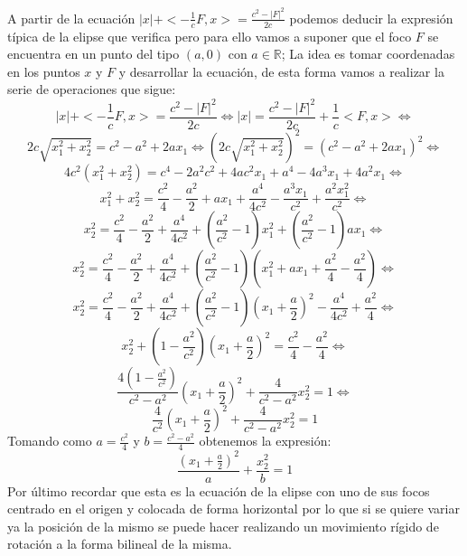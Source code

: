 \documentclass[a4paper, 11pt]{article} %
\begin{document}
	A partir de la ecuación $|x|+<-\frac{1}{c}F,x> = \frac{c^2-|F|^2}{2c}$ podemos deducir la expresión típica de la elipse que verifica pero para ello vamos a suponer que el foco $F$ se encuentra en un punto del tipo $(a, 0)$ con $a\in \mathbb{R}$; La idea es tomar coordenadas en los puntos $x$ y $F$ y desarrollar la ecuación, de esta forma vamos a realizar la serie de operaciones que sigue:
	$$|x|+<-\frac{1}{c}F,x> = \frac{c^2-|F|^2}{2c} \Leftrightarrow |x| = \frac{c^2-|F|^2}{2c}+\frac{1}{c}<F,x> \Leftrightarrow$$
	$$2c\sqrt{x_1^2+x_2^2} = c^2-a^2+2ax_1 \Leftrightarrow (2c\sqrt{x_1^2+x_2^2})^2 = (c^2-a^2+2ax_1)^2 \Leftrightarrow$$
	$$4c^2(x_1^2+x_2^2)=c^4-2a^2c^2+4ac^2x_1+a^4-4a^3x_1+4a^2x_1 \Leftrightarrow$$
	$$x_1^2+x_2^2=\frac{c^2}{4}-\frac{a^2}{2}+ax_1+\frac{a^4}{4c^2}-\frac{a^3x_1}{c^2}+\frac{a^2x_1^2}{c^2} \Leftrightarrow$$
	$$x_2^2 = \frac{c^2}{4}-\frac{a^2}{2}+\frac{a^4}{4c^2}+(\frac{a^2}{c^2}-1)x_1^2 +(\frac{a^2}{c^2}-1)ax_1 \Leftrightarrow$$
	$$x_2^2 = \frac{c^2}{4}-\frac{a^2}{2}+\frac{a^4}{4c^2}+(\frac{a^2}{c^2}-1)(x_1^2 +ax_1+\frac{a^2}{4}-\frac{a^2}{4}) \Leftrightarrow$$
	$$x_2^2 = \frac{c^2}{4}-\frac{a^2}{2}+\frac{a^4}{4c^2}+(\frac{a^2}{c^2}-1)(x_1+\frac{a}{2})^2-\frac{a^4}{4c^2}+\frac{a^2}{4} \Leftrightarrow$$
	$$x_2^2+(1-\frac{a^2}{c^2})(x_1+\frac{a}{2})^2=\frac{c^2}{4}-\frac{a^2}{4} \Leftrightarrow$$
	$$\frac{4(1-\frac{a^2}{c^2})}{c^2-a^2}(x_1+\frac{a}{2})^2+\frac{4}{c^2-a^2}x_2^2=1 \Leftrightarrow$$
	$$\frac{4}{c^2}(x_1+\frac{a}{2})^2+\frac{4}{c^2-a^2}x_2^2=1$$
	Tomando como $a = \frac{c^2}{4}$ y $b = \frac{c^2-a^2}{4}$ obtenemos la expresión:
	$$\frac{(x_1+\frac{a}{2})^2}{a}+\frac{x_2^2}{b}=1$$
	Por último recordar que esta es la ecuación de la elipse con uno de sus focos centrado en el origen y colocada de forma horizontal por lo que si se quiere variar ya la posición de la mismo se puede hacer realizando un movimiento rígido de rotación a la forma bilineal de la misma.
\end{document}

